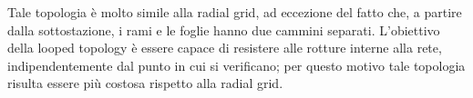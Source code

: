 \begin{figure}[h]
\end{figure}
\newpage
Tale topologia è molto simile alla radial grid, ad eccezione del fatto che, a partire dalla sottostazione, i rami e le foglie hanno due cammini separati. L'obiettivo della looped topology è essere capace di resistere alle rotture interne alla rete, indipendentemente dal punto in cui si verificano; per questo motivo tale topologia risulta essere più costosa rispetto alla radial grid.
